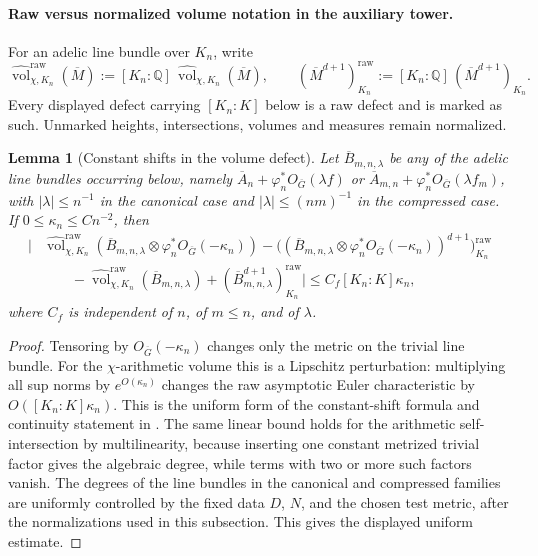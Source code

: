 \documentclass[10pt,a4paper]{amsart}
\theoremstyle{plain}
\newtheorem{lemma}[theorem]{Lemma}
\theoremstyle{plain}
\numberwithin{equation}{section}
\providecommand{\ol}{\overline}
\begin{document}
\paragraph{Raw versus normalized volume notation in the auxiliary tower.}
For an adelic line bundle over \(K_n\), write
\[
\widehat{\operatorname{vol}}_{\chi,K_n}^{\mathrm{raw}}(\overline M)
:=[K_n:\mathbb Q]\,
\widehat{\operatorname{vol}}_{\chi,K_n}(\overline M),
\qquad
(\overline M^{d+1})^{\mathrm{raw}}_{K_n}
:=[K_n:\mathbb Q]\,(\overline M^{d+1})_{K_n}.
\]
Every displayed defect carrying \([K_n:K]\) below is a raw defect and is
marked as such.  Unmarked heights, intersections, volumes and measures remain
normalized.

\begin{lemma}[Constant shifts in the volume defect]
	\label{lem:constant-shift-volume-defect}
	Let \(\ol B_{m,n,\lambda}\) be any of the adelic line bundles occurring below,
	namely \(\ol A_n+\varphi_n^*O_{\ol G}(\lambda f)\) or
	\(\ol A_{m,n}+\varphi_n^*O_{\ol G}(\lambda f_m)\), with
	\(|\lambda|\le n^{-1}\) in the canonical case and
	\(|\lambda|\le(nm)^{-1}\) in the compressed case.  If
	\(0\le \kappa_n\le Cn^{-2}\), then
	\[
	\begin{aligned}
		\bigl|&
		\widehat{\operatorname{vol}}_{\chi,K_n}^{\mathrm{raw}}
		(\ol B_{m,n,\lambda}\otimes\varphi_n^*O_{\ol G}(-\kappa_n))
		-
		\bigl((\ol B_{m,n,\lambda}\otimes
		\varphi_n^*O_{\ol G}(-\kappa_n))^{d+1}\bigr)^{\mathrm{raw}}_{K_n}  \\
		&\qquad
		-\widehat{\operatorname{vol}}_{\chi,K_n}^{\mathrm{raw}}(\ol B_{m,n,\lambda})
		+(\ol B_{m,n,\lambda}^{d+1})^{\mathrm{raw}}_{K_n}
		\bigr|
		\le C_f[K_n:K]\kappa_n ,
	\end{aligned}
	\]
	where \(C_f\) is independent of \(n\), of \(m\le n\), and of \(\lambda\).
\end{lemma}

\begin{proof}
	Tensoring by \(O_{\ol G}(-\kappa_n)\) changes only the metric on the trivial
	line bundle.  For the \(\chi\)-arithmetic volume this is a Lipschitz
	perturbation: multiplying all sup norms by \(e^{O(\kappa_n)}\) changes the
	raw asymptotic Euler characteristic by \(O([K_n:K]\kappa_n)\).  This is
	the uniform form of the constant-shift formula and continuity statement in
	\cite[Lemma 6(a),(b)]{Ku1}.  The same linear bound holds for the arithmetic
	self-intersection by multilinearity,
	because inserting one constant metrized trivial factor gives the algebraic
	degree, while terms with two or more such factors vanish.  The degrees of the
	line bundles in the canonical and compressed families are uniformly controlled
	by the fixed data \(D\), \(N\), and the chosen test metric, after the
	normalizations used in this subsection.  This gives the displayed uniform
	estimate.
\end{proof}
\end{document}
